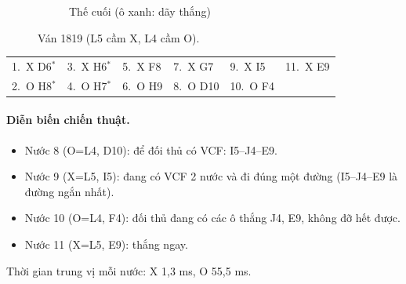 \begin{figure}[H]
\begin{subfigure}[t]{.48\linewidth}
    \caption{Thế cuối (ô xanh: dãy thắng)}
  \end{subfigure}
  \caption{Ván 1819 (L5 cầm X, L4 cầm O).}
  \label{fig:cs-van-19}
\end{figure}
{\footnotesize\linespread{1}\selectfont
\noindent\begin{tabularx}{\linewidth}{*{6}{X}}
\toprule
1.~X D6$^\ast$ & 3.~X H6$^\ast$ & 5.~X F8 & 7.~X G7 & 9.~X I5 & 11.~X E9 \\
2.~O H8$^\ast$ & 4.~O H7$^\ast$ & 6.~O H9 & 8.~O D10 & 10.~O F4 &  \\
\bottomrule
\end{tabularx}\par}
\paragraph{Diễn biến chiến thuật.}
\begin{itemize}\small
\setlength{\itemsep}{0pt}
  \item Nước 8 (O=L4, D10): để đối thủ có VCF: I5--J4--E9.
  \item Nước 9 (X=L5, I5): đang có VCF 2 nước và đi đúng một đường (I5--J4--E9 là đường ngắn nhất).
  \item Nước 10 (O=L4, F4): đối thủ đang có các ô thắng J4, E9, không đỡ hết được.
  \item Nước 11 (X=L5, E9): thắng ngay.
\end{itemize}
Thời gian trung vị mỗi nước: X 1,3 ms, O 55,5 ms.
\clearpage

